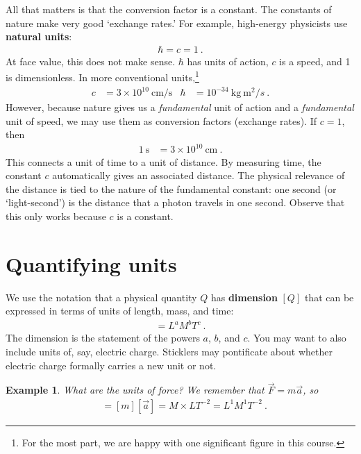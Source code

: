 \documentclass[
  11pt,
	colorful,
	raggedright,
]{tufte-style-thesis-flip}
\newtheorem{example}{Example}[section]
\begin{document}
All that matters is that the conversion factor is a constant. The constants of nature make very good `exchange rates.' For example, high-energy physicists use \textbf{natural units}:
\begin{align}
  \hbar = c = 1 \ .
\end{align}
At face value, this does not make sense. $\hbar$ has units of action, $c$ is a speed, and 1 is dimensionless. In more conventional units,\footnote{For the most part, we are happy with one significant figure in this course.}
\begin{align}
  c &= 3 \times 10^{10}~\text{cm}/\text{s} 
  &
  \hbar &= 10^{-34}~\text{kg}~\text{m}^2/s
  \ .
\end{align}
However, because nature gives us a \emph{fundamental} unit of action and a \emph{fundamental} unit of speed, we may use them as conversion factors (exchange rates). If $c=1$, then 
\begin{align}
  1~\text{s} &=  3 \times 10^{10}~\text{cm} \ .
\end{align}
This connects a unit of time to a unit of distance. By measuring time, the constant $c$ automatically gives an associated distance. The physical relevance of the distance is tied to the nature of the fundamental constant: one second (or `light-second') is the distance that a photon travels in one second. Observe that this only works because $c$ is a constant. 

\section{Quantifying units}

We use the notation that a physical quantity $Q$ has \textbf{dimension} $[Q]$ that can be expressed in terms of units of length, mass, and time:
\begin{align}
  [Q] = L^a M^b T^c \ .
\end{align}
The {dimension} is the statement of the powers $a$, $b$, and $c$. You may want to also include units of, say, electric charge. Sticklers may pontificate about whether electric charge formally carries a new unit or not. 


\begin{example}
What are the units of force? We remember that $\vec{F} = m\vec{a}$, so 
\begin{align}
  [\vec F] &= [m][\vec{a}] = M\times L T^{-2} = L^1 M^1 T^{-2} \ .
  \label{eq:02:force:units}
\end{align}
\end{example}
\end{document}
